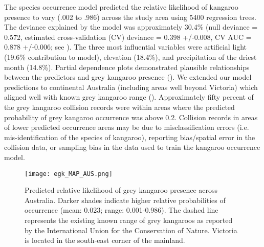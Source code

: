 The species occurrence model predicted the relative likelihood of kangaroo presence to vary (.002 to .986) across the study area using 5400 regression trees. The deviance explained by the model was approximately 30.4\% (null deviance = 0.572, estimated cross-validation (CV) deviance = 0.398 +/-0.008, CV AUC = 0.878 +/-0.006; see ). The three most influential variables were artificial light (19.6\% contribution to model), elevation (18.4\%), and precipitation of the driest month (14.8\%). Partial dependence plots demonstrated plausible relationships between the predictors and grey kangaroo presence (). We extended our model predictions to continental Australia (including areas well beyond Victoria) which aligned well with known grey kangaroo range (). Approximately fifty percent of the grey kangaroo collision records were within areas where the predicted probability of grey kangaroo occurrence was above 0.2. Collision records in areas of lower predicted occurrence areas may be due to misclassification errors (i.e. mis-identification of the species of kangaroo), reporting bias/spatial error in the collision data, or sampling bias in the data used to train the kangaroo occurrence model.

\begin{figure*}[htp]
  \centering
  \texttt{[image: egk\_MAP\_AUS.png]}
  \caption[Predicted relative likelihood of grey kangaroo presence across Australia]{Predicted relative likelihood of grey kangaroo presence across Australia. Darker shades indicate higher relative probabilities of occurrence (mean: 0.023; range: 0.001-0.986). The dashed line represents the existing known range of grey kangaroos as reported by the International Union for the Conservation of Nature. Victoria is located in the south-east corner of the mainland.}
  \label{egk_map_aus}
\end{figure*}

